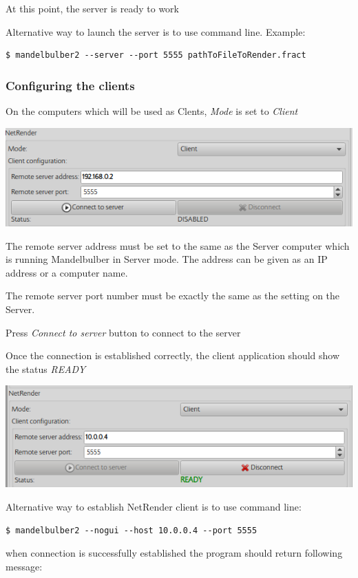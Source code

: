 At this point, the server is ready to work

Alternative way to launch the server is to use command line. Example:

\begin{verbatim} 
$ mandelbulber2 --server --port 5555 pathToFileToRender.fract
\end{verbatim}

\subsubsection{Configuring the clients}\label{configuring-the-clients}

On the computers which will be used as Clents, \emph{Mode} is set to
\emph{Client}

\includegraphics[width=0.7\linewidth]{img/manual/media/netrender_client.png}

The remote server address must be set to the same as the Server computer which
is running Mandelbulber in Server mode. The address can be given as an IP
address or a computer name.

The remote server port number must be exactly the same as the setting on the
Server.

Press \emph{Connect to server} button to connect to the server

Once the connection is established correctly, the client application should show
the status \emph{READY}

\includegraphics[width=0.7\linewidth]{img/manual/media/netrender_client_connected.png}

Alternative way to establish NetRender client is to use command line:

\begin{verbatim} 
$ mandelbulber2 --nogui --host 10.0.0.4 --port 5555
\end{verbatim}

when connection is successfully established the program should return following
message:

